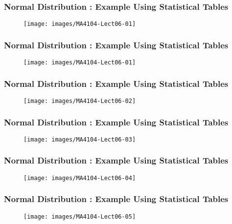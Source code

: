 \documentclass{beamer}
\begin{document}
	
	\begin{frame}
		\frametitle{Normal Distribution : Example Using Statistical Tables}
		\begin{figure}
			\centering
			\texttt{[image: images/MA4104-Lect06-01]}
			\caption{}
			\label{fig:MA4104-Lect06-01}
		\end{figure}
	\end{frame}
	\begin{frame}
		\frametitle{Normal Distribution : Example Using Statistical Tables}
		\begin{figure}
			\centering
			\texttt{[image: images/MA4104-Lect06-01]}
		\end{figure}
	\end{frame}
	\begin{frame}
		\frametitle{Normal Distribution : Example Using Statistical Tables}
		\begin{figure}
			\centering
			\texttt{[image: images/MA4104-Lect06-02]}
		\end{figure}
	\end{frame}
	\begin{frame}
		\frametitle{Normal Distribution : Example Using Statistical Tables}
		\begin{figure}
			\centering
			\texttt{[image: images/MA4104-Lect06-03]}
			
		\end{figure}
	\end{frame}
	\begin{frame}
		\frametitle{Normal Distribution : Example Using Statistical Tables}
		\begin{figure}
			\centering
			\texttt{[image: images/MA4104-Lect06-04]}
			
		\end{figure}
	\end{frame}
	\begin{frame}
		\frametitle{Normal Distribution : Example Using Statistical Tables}
		\begin{figure}
			\centering	
			\texttt{[image: images/MA4104-Lect06-05]}
			
		\end{figure}
	\end{frame}
\end{document}
